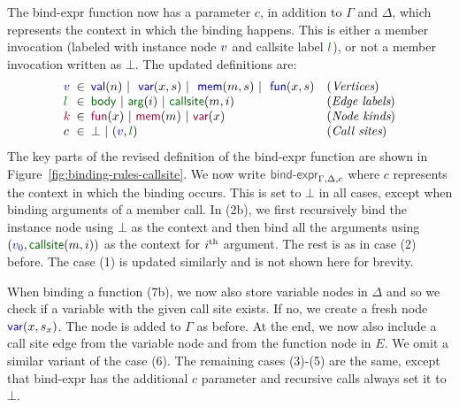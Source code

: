 \documentclass[acmsmall,anonymous,fleqn]{acmart}\settopmatter{printfolios=false,printccs=false,printacmref=false}
\theoremstyle{plain}
\theoremstyle{definition}
\newcommand{\ident}[1]{\textnormal{\textcolor{idclr}{\sffamily #1}}}
\newcommand{\bndclr}[1]{\textcolor{kvdclr}{#1}}
\newcommand{\bkndclr}[1]{\textcolor{prepclr}{#1}}
\newcommand{\blblclr}[1]{\textcolor{numclr}{#1}}
\newcommand{\bnd}[1]{\textnormal{\textcolor{kvdclr}{\sffamily #1}}}
\newcommand{\bknd}[1]{\textnormal{\textcolor{prepclr}{\sffamily #1}}}
\newcommand{\blbl}[1]{\textnormal{\textcolor{numclr}{\sffamily #1}}}
\begin{document}
The \ident{bind-expr} function now has a parameter $c$, in addition to $\Gamma$ and $\Delta$, which
represents the context in which the binding happens. This is either a member invocation (labeled
with instance node $\bndclr{v}$ and \blbl{callsite} label $\blblclr{l}$), or not a member
invocation written as $\bot$. The updated definitions are:
%
\begin{equation*}
\begin{array}{lcll}
\bndclr{v} &\hspace{-0.5em}\in\hspace{-0.5em}&\bnd{val}(n)~|~\bnd{var}(x, s)~|~\bnd{mem}(m, s)~|~\bnd{fun}(x, s)&(\textit{Vertices})\\
\blblclr{l}&\hspace{-0.5em}\in\hspace{-0.5em}&\blbl{body}~|~\blbl{arg}(i)~|~\blbl{callsite}(m,i)&(\textit{Edge labels})\\
\bkndclr{k}&\hspace{-0.5em}\in\hspace{-0.5em}&\bknd{fun}(x)~|~\bknd{mem}(m)~|~\bknd{var}(x)&(\textit{Node kinds})\\
          c&\hspace{-0.5em}\in\hspace{-0.5em}&\bot ~|~(\bndclr{v}, \blblclr{l})&(\textit{Call sites})\\
\end{array}
\end{equation*}
%
The key parts of the revised definition of the \ident{bind-expr} function are shown in Figure~\ref{fig:binding-rules-callsite}.
We now write $\ident{bind-expr}_{\Gamma,\Delta,c}$ where $c$ represents the context in which the
binding occurs. This is set to $\bot$ in all cases, except when binding arguments of a member call.
In (2b), we first recursively bind the instance node using $\bot$ as the context and then
bind all the arguments using $(\bndclr{v_0}, \blbl{callsite}(m, i))$ as the context for $i^{\textnormal{th}}$
argument. The rest is as in case (2) before. The case (1) is updated similarly and is not shown
here for brevity.

When binding a function (7b), we now also store variable nodes in $\Delta$ and so we check if a
variable with the given call site exists. If no, we create a fresh node $\bnd{var}(x, s_x)$.
The node is added to $\Gamma$ as before. At the end, we now also include a call site edge from the
variable node and from the function node in $E$. We omit a similar variant of the case (6).
The remaining cases (3)-(5) are the same, except that \ident{bind-expr} has the additional $c$ parameter
and recursive calls always set it to $\bot$.
\end{document}
